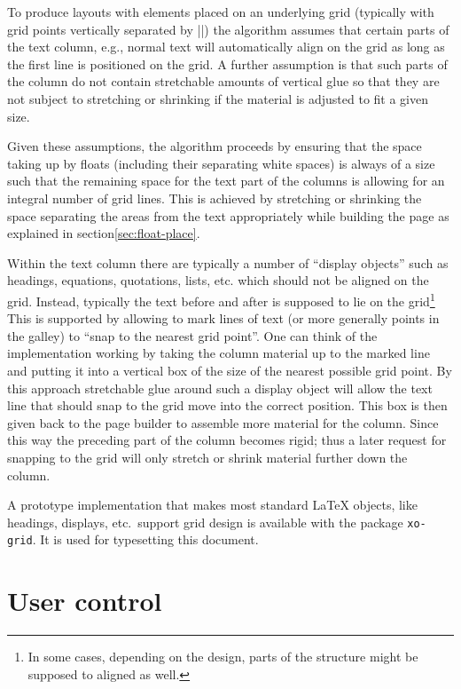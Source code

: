 \documentclass[twocolumn]{article}
\begin{document}
To produce layouts with elements placed on an underlying grid
(typically with grid points vertically separated by |\baselineskip|)
the algorithm assumes that certain parts of the text column, e.g.,
normal text will automatically align on the grid as long as the first
line is positioned on the grid. A further assumption is that such
parts of the column do not contain stretchable amounts of vertical
glue so that they are not subject to stretching or shrinking if the
material is adjusted to fit a given size.

Given these assumptions, the algorithm proceeds by ensuring that the
space taking up by floats (including their separating white spaces) is
always of a size such that the remaining space for the text part of the
columns is allowing for an integral number of grid lines. This is
achieved by stretching or shrinking the space separating the areas
from the text appropriately while building the page as explained in
section\vref{sec:float-place}.

Within the text column there are typically a number of ``display
objects'' such as headings, equations, quotations, lists, etc\@. which
should not be aligned on the grid. Instead, typically the text before
and after is supposed to lie on the grid\footnote{In some cases,
depending on the design, parts of the structure might be supposed to
aligned as well.} This is supported by allowing to mark lines of text
(or more generally points in the galley) to ``snap to the nearest grid
point''. One can think of the implementation working by taking the
column material up to the marked line and putting it into a vertical
box of the size of the nearest possible grid point. By this approach
stretchable glue around such a display object will allow the text line
that should snap to the grid move into the correct position. This box
is then given back to the page builder to assemble more material for
the column. Since this way the preceding part of the column becomes
rigid; thus a later request for snapping to the grid will only stretch
or shrink material further down the column.

A prototype implementation that makes most standard \LaTeX{} objects,
like headings, displays, etc.\ support grid design is available with
the package \texttt{xo-grid}. It is used for typesetting this
document.


\section{User control}
\end{document}
